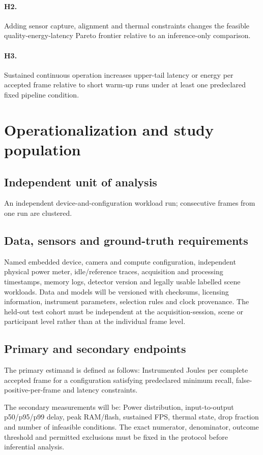 \documentclass[11pt,a4paper]{article}
\begin{document}
\paragraph{H2.} Adding sensor capture, alignment and thermal constraints changes the feasible quality-energy-latency Pareto frontier relative to an inference-only comparison.

\paragraph{H3.} Sustained continuous operation increases upper-tail latency or energy per accepted frame relative to short warm-up runs under at least one predeclared fixed pipeline condition.

\section{Operationalization and study population}
\subsection{Independent unit of analysis}
An independent device-and-configuration workload run; consecutive frames from one run are clustered.

\subsection{Data, sensors and ground-truth requirements}
Named embedded device, camera and compute configuration, independent physical power meter, idle/reference traces, acquisition and processing timestamps, memory logs, detector version and legally usable labelled scene workloads. Data and models will be versioned with checksums, licensing information, instrument parameters, selection rules and clock provenance. The held-out test cohort must be independent at the acquisition-session, scene or participant level rather than at the individual frame level.

\subsection{Primary and secondary endpoints}
The primary estimand is defined as follows: Instrumented Joules per complete accepted frame for a configuration satisfying predeclared minimum recall, false-positive-per-frame and latency constraints.

The secondary measurements will be: Power distribution, input-to-output p50/p95/p99 delay, peak RAM/flash, sustained FPS, thermal state, drop fraction and number of infeasible conditions. The exact numerator, denominator, outcome threshold and permitted exclusions must be fixed in the protocol before inferential analysis.
\end{document}
